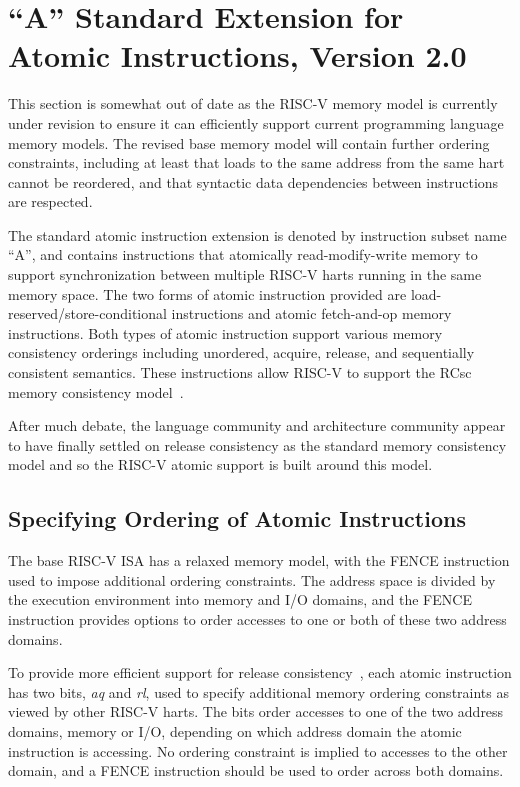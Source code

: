 \chapter{``A'' Standard Extension for Atomic Instructions, Version 2.0}
\label{atomics}

\begin{commentary}
This section is somewhat out of date as the RISC-V memory model is
currently under revision to ensure it can efficiently support current
programming language memory models.  The revised base memory model
will contain further ordering constraints, including at least that
loads to the same address from the same hart cannot be reordered, and
that syntactic data dependencies between instructions are respected.
\end{commentary}

The standard atomic instruction extension is denoted by instruction
subset name ``A'', and contains instructions that atomically
read-modify-write memory to support synchronization between multiple
RISC-V harts running in the same memory space.  The two forms of
atomic instruction provided are load-reserved/store-conditional
instructions and atomic fetch-and-op memory instructions.  Both types
of atomic instruction support various memory consistency orderings
including unordered, acquire, release, and sequentially consistent
semantics.  These instructions allow RISC-V to support the RCsc memory
consistency model~\cite{Gharachorloo90memoryconsistency}.

\begin{commentary}
After much debate, the language community and architecture community
appear to have finally settled on release consistency as the standard
memory consistency model and so the RISC-V atomic support is built
around this model.
\end{commentary}

\section{Specifying Ordering of Atomic Instructions}

The base RISC-V ISA has a relaxed memory model, with the FENCE
instruction used to impose additional ordering constraints.  The
address space is divided by the execution environment into memory and
I/O domains, and the FENCE instruction provides options to order
accesses to one or both of these two address domains.

To provide more efficient support for release
consistency~\cite{Gharachorloo90memoryconsistency}, each atomic
instruction has two bits, {\em aq} and {\em rl}, used to specify
additional memory ordering constraints as viewed by other RISC-V
harts.  The bits order accesses to one of the two address domains,
memory or I/O, depending on which address domain the atomic
instruction is accessing.  No ordering constraint is implied to
accesses to the other domain, and a FENCE instruction should be used
to order across both domains.

